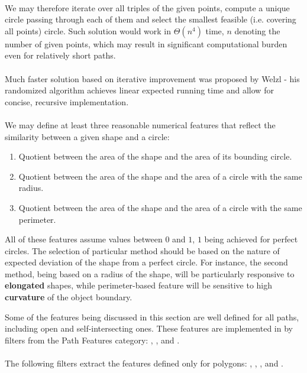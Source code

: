 \paragraph*{}
We may therefore iterate over all triples of the given points, compute a unique circle passing through each of them and select the smallest feasible (i.e. covering all points) circle. Such solution would work in $\Theta(n^4)$ time, $n$ denoting the number of given points, which may result in significant computational burden even for relatively short paths.

\paragraph*{}
Much faster solution based on iterative improvement was proposed\cite{Welzl91} by Welzl - his randomized algorithm achieves linear expected running time and allow for concise, recursive implementation.

\paragraph*{}
We may define at least three reasonable numerical features that reflect the similarity between a given shape and a circle:
\begin{enumerate}
	\item Quotient between the area of the shape and the area of its bounding circle.
	\item Quotient between the area of the shape and the area of a circle with the same radius.
	\item Quotient between the area of the shape and the area of a circle with the same perimeter.
\end{enumerate}
All of these features assume values between $0$ and $1$, $1$ being achieved for perfect circles. The selection of particular method should be based on the nature of expected deviation of the shape from a perfect circle. For instance, the second method, being based on a radius of the shape, will be particularly responsive to \textbf{elongated} shapes, while perimeter-based feature will be sensitive to high \textbf{curvature} of the object boundary.

\begin{refImpl}
Some of the features being discussed in this section are well defined for all paths, including open and self-intersecting ones. These features are implemented in \studio by filters from the Path Features category:
, 
, 
 and
.

\paragraph*{}
The following \studio filters extract the features defined only for polygons: 
, 
, 
, 
 and 
.
\end{refImpl}